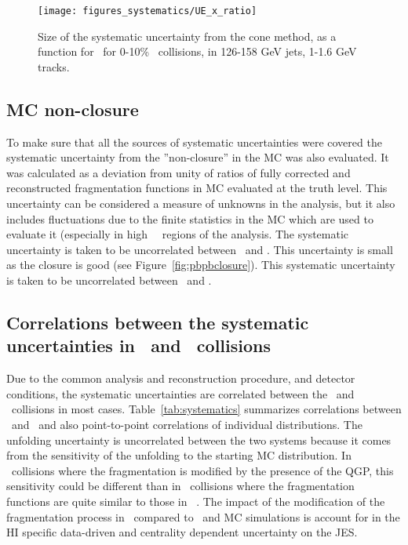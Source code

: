 \begin{figure}
\centerline{\texttt{[image: figures\_systematics/UE\_x\_ratio]}}
    \caption{Size of the systematic uncertainty from the cone method, as a function for \rvar\ for 0-10\% \pbpb\ collisions, in 126-158 GeV jets, 1-1.6 GeV tracks.}
    \label{fig:conemethod_corr}

\end{figure}


\subsection{MC non-closure}
To make sure that all the sources of systematic uncertainties were covered the systematic uncertainty from the ”non-closure” in the MC was also evaluated. It was 
calculated as a deviation from unity of ratios of fully corrected and reconstructed fragmentation functions in MC %
evaluated at the truth level. 
This uncertainty can be considered a measure of unknowns in the analysis, but it also includes fluctuations due to 
the finite statistics in the MC which are used to evaluate it (especially in high \z\ \pttrk\ regions of
the analysis.
The systematic uncertainty is taken to be uncorrelated between \pbpb\ and \pp. This uncertainty is small as the
closure is good (see Figure~\ref{fig:pbpbclosure}).  This systematic uncertainty is taken to be uncorrelated 
between \pbpb\ and \pp.

\subsection{Correlations between the systematic uncertainties in \pbpb\ and \pp\ collisions}

Due to the common analysis and reconstruction procedure, and detector conditions, the systematic uncertainties are correlated between the \pp\ and
\pbpb\ collisions in most cases. Table~\ref{tab:systematics} summarizes correlations between \pp\ and \PbPb\ and also point-to-point correlations of individual distributions. The unfolding uncertainty is uncorrelated between the two systems because it
comes from the sensitivity of the unfolding to the starting MC distribution. In \pbpb\ collisions where the fragmentation is modified by the presence of the QGP, this sensitivity could be different than in \pp\ collisions where the fragmentation functions are quite similar to those in \pythiaeight~\cite{Aaboud:2017tke}. The impact of the modification of the fragmentation process in \PbPb\ compared to \pp\ and MC simulations is account for in the HI specific data-driven and centrality dependent uncertainty on the JES.

